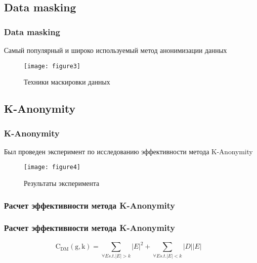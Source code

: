 \documentclass[russian]{beamer}
\begin{document}
\subsection{Data masking}
\begin{frame}
    \frametitle{Data masking}

    Самый популярный и широко используемый метод анонимизации данных

    \begin{figure}[ht!]
       \texttt{[image: figure3]}
       \caption{Техники маскировки данных}
       \label{fig:3}
   \end{figure}
\end{frame}

\subsection{K-Anonymity}
\begin{frame}
    \frametitle{K-Anonymity}

    Был проведен \alert{эксперимент} по исследованию эффективности метода K-Anonymity

    \begin{figure}[ht!]
       \texttt{[image: figure4]}
       \caption{Результаты эксперимента}
       \label{fig:4}
   \end{figure}
\end{frame}

\subsubsection{Расчет эффективности метода K-Anonymity}
\begin{frame}
    \frametitle{Расчет эффективности метода K-Anonymity}

     $$
        \mathrm{C_{DM}(g,k)} = \sum_{\forall E s.t. \left | E \right | > k}
        \left | E \right |^2 + \sum_{\forall E s.t. \left | E \right | < k}
        \left |D \right | \left | E \right |
    $$
\end{frame}
\end{document}
